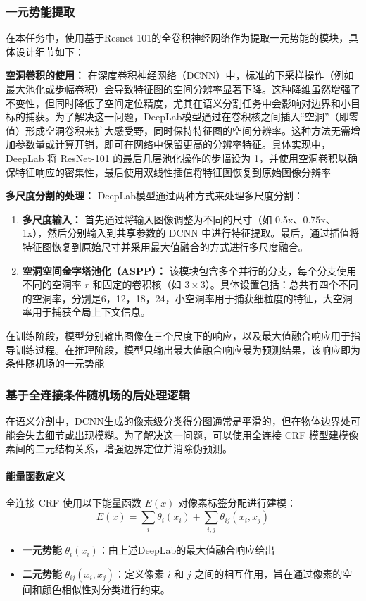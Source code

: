 \documentclass[a4paper,12pt]{ctexart}
\begin{document}
\subsubsection{一元势能提取}
在本任务中，使用基于Resnet-101的全卷积神经网络\cite{Chen2016DeepLabSI}作为提取一元势能的模块，具体设计细节如下：

\textbf{空洞卷积的使用：} 在深度卷积神经网络（DCNN）中，标准的下采样操作\cite{Shelhamer2014FullyCN}（例如最大池化或步幅卷积）会导致特征图的空间分辨率显著下降。这种降维虽然增强了不变性，但同时降低了空间定位精度，尤其在语义分割任务中会影响对边界和小目标的捕获。为了解决这一问题，DeepLab模型通过在卷积核之间插入“空洞”（即零值）形成空洞卷积来扩大感受野，同时保持特征图的空间分辨率。这种方法无需增加参数量或计算开销，即可在网络中保留更高的分辨率特征。具体实现中，DeepLab 将 ResNet-101 的最后几层池化操作的步幅设为 1，并使用空洞卷积以确保特征响应的密集性，最后使用双线性插值将特征图恢复到原始图像分辨率


\textbf{多尺度分割的处理：} DeepLab模型通过两种方式来处理多尺度分割：
\begin{enumerate}
    \item \textbf{多尺度输入：} 首先通过将输入图像调整为不同的尺寸（如 0.5x、0.75x、1x），然后分别输入到共享参数的 DCNN 中进行特征提取。最后，通过插值将特征图恢复到原始尺寸并采用最大值融合的方式进行多尺度融合。
    \item \textbf{空洞空间金字塔池化（ASPP）：} 该模块包含多个并行的分支，每个分支使用不同的空洞率 $r$ 和固定的卷积核（如 $3 \times 3$）。具体设置包括：总共有四个不同的空洞率，分别是6，12，18，24，小空洞率用于捕获细粒度的特征，大空洞率用于捕获全局上下文信息。
\end{enumerate}

在训练阶段，模型分别输出图像在三个尺度下的响应，以及最大值融合响应用于指导训练过程。在推理阶段，模型只输出最大值融合响应最为预测结果，该响应即为条件随机场的一元势能

\subsubsection{基于全连接条件随机场的后处理逻辑}

在语义分割中，DCNN生成的像素级分类得分图通常是平滑的，但在物体边界处可能会失去细节或出现模糊。为了解决这一问题，可以使用全连接 CRF 模型建模像素间的二元结构关系，增强边界定位并消除伪预测。

\paragraph{能量函数定义}
    全连接 CRF 使用以下能量函数 $E(x)$ 对像素标签分配进行建模：
    $$
    E(x) = \sum_{i} \theta_i(x_i) + \sum_{i,j} \theta_{ij}(x_i, x_j)
    $$
    \begin{itemize}
        \item \textbf{一元势能} $\theta_i(x_i)$：由上述DeepLab的最大值融合响应给出
        \item \textbf{二元势能} $\theta_{ij}(x_i, x_j)$：定义像素 $i$ 和 $j$ 之间的相互作用，旨在通过像素的空间和颜色相似性对分类进行约束。     
    \end{itemize}
\end{document}
